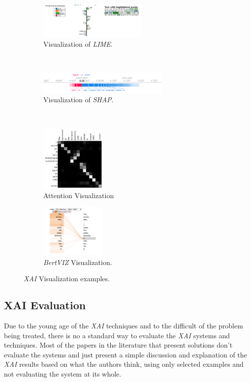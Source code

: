 \paragraph{}
\begin{figure}[h]
\centering
\begin{subfigure}{0.3\textwidth}
  \centering
	\includegraphics[width=200px]{images/lime-result-2a}
	\caption{Visualization of \emph{LIME}.}
	\label{fig:vis-lime}
\end{subfigure}
\medskip\\
\begin{subfigure}{0.3\textwidth}
  \centering
	\includegraphics[width=240px]{images/shap}
	\caption{Visualization of \emph{SHAP}.}
	\label{fig:vis-shap}
\end{subfigure}
\medskip\\
\begin{subfigure}{0.45\textwidth}
  \centering
	\includegraphics[width=120px]{images/attention}
	\caption{Attention Visualization}
	\label{fig:vis-att}
\end{subfigure}
\begin{subfigure}{0.45\textwidth}
  \centering
	\includegraphics[width=120px]{images/selfattention}
	\caption{\emph{BertVIZ} Visualization.}
	\label{fig:vis-bertviz}
\end{subfigure}
\caption{\emph{XAI} Visualization examples.}
\label{fig:vis-examples}
\end{figure}

\subsection{XAI Evaluation}
\noindent Due to the young age of the \emph{XAI} techniques and to the difficult of the problem being treated, there is no a standard way to evaluate the \emph{XAI} systems and techniques. Most of the papers in the literature that present solutions \cite{Xie2017} don't evaluate the systems and just present a simple discussion and explanation of the \emph{XAI} results based on what the authors think, using only selected examples and not evaluating the system at its whole.
